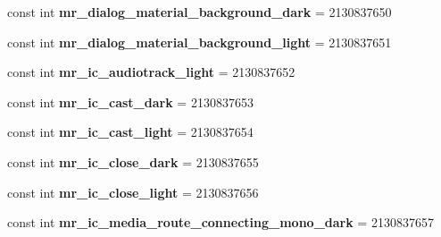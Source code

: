\begin{DoxyCompactItemize}
const int {\bfseries mr\+\_\+dialog\+\_\+material\+\_\+background\+\_\+dark} = 2130837650
\item 
\mbox{\label{class_sample_app_1_1_droid_1_1_resource_1_1_drawable_a93a6e6e78c7b4d8210f4d5c27805ce85}} 
const int {\bfseries mr\+\_\+dialog\+\_\+material\+\_\+background\+\_\+light} = 2130837651
\item 
\mbox{\label{class_sample_app_1_1_droid_1_1_resource_1_1_drawable_ac0a034755f47a8ea49ec3bb8b49058e6}} 
const int {\bfseries mr\+\_\+ic\+\_\+audiotrack\+\_\+light} = 2130837652
\item 
\mbox{\label{class_sample_app_1_1_droid_1_1_resource_1_1_drawable_a6676c450efcf6cf7497a4ed5bf7ec3d8}} 
const int {\bfseries mr\+\_\+ic\+\_\+cast\+\_\+dark} = 2130837653
\item 
\mbox{\label{class_sample_app_1_1_droid_1_1_resource_1_1_drawable_a39702aee57add012dab69f9c22371e30}} 
const int {\bfseries mr\+\_\+ic\+\_\+cast\+\_\+light} = 2130837654
\item 
\mbox{\label{class_sample_app_1_1_droid_1_1_resource_1_1_drawable_a26486a0d242c3d5503792786999fac53}} 
const int {\bfseries mr\+\_\+ic\+\_\+close\+\_\+dark} = 2130837655
\item 
\mbox{\label{class_sample_app_1_1_droid_1_1_resource_1_1_drawable_a1401d35f12dd5b0d788211f8ffa7e462}} 
const int {\bfseries mr\+\_\+ic\+\_\+close\+\_\+light} = 2130837656
\item 
\mbox{\label{class_sample_app_1_1_droid_1_1_resource_1_1_drawable_a72fb2b9a1a65487749b9632125504d4c}} 
const int {\bfseries mr\+\_\+ic\+\_\+media\+\_\+route\+\_\+connecting\+\_\+mono\+\_\+dark} = 2130837657
\item 
\mbox{\label{class_sample_app_1_1_droid_1_1_resource_1_1_drawable_a2e1cd8ca3837f75908e71ae74f026d9d}} 

\end{DoxyCompactItemize}
